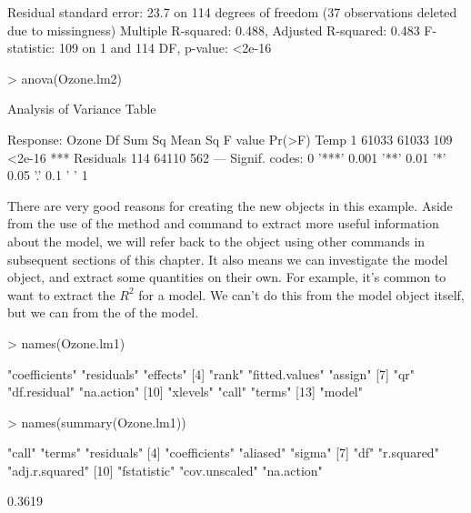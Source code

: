 \begin{Schunk}
\begin{Soutput}
Residual standard error: 23.7 on 114 degrees of freedom
  (37 observations deleted due to missingness)
Multiple R-squared:  0.488,	Adjusted R-squared:  0.483 
F-statistic:  109 on 1 and 114 DF,  p-value: <2e-16
\end{Soutput}
\begin{Sinput}
> anova(Ozone.lm2) 
\end{Sinput}
\begin{Soutput}
Analysis of Variance Table

Response: Ozone
           Df Sum Sq Mean Sq F value Pr(>F)    
Temp        1  61033   61033     109 <2e-16 ***
Residuals 114  64110     562                   
---
Signif. codes:  
0 '***' 0.001 '**' 0.01 '*' 0.05 '.' 0.1 ' ' 1
\end{Soutput}
\end{Schunk}

There are very good reasons for creating the new objects in this example. Aside from the use of the  method and  command to extract more useful information about the model, we will refer back to the object using other commands in subsequent sections of this chapter. It also means we can investigate the model object, and extract some quantities on their own. For example, it's common to want to extract the $R^2$ for a model. We can't do this from the model object itself, but we can from the  of the model. 

\begin{Schunk}
\begin{Sinput}
> names(Ozone.lm1) 
\end{Sinput}
\begin{Soutput}
 [1] "coefficients"  "residuals"     "effects"      
 [4] "rank"          "fitted.values" "assign"       
 [7] "qr"            "df.residual"   "na.action"    
[10] "xlevels"       "call"          "terms"        
[13] "model"        
\end{Soutput}
\begin{Sinput}
> names(summary(Ozone.lm1)) 
\end{Sinput}
\begin{Soutput}
 [1] "call"          "terms"         "residuals"    
 [4] "coefficients"  "aliased"       "sigma"        
 [7] "df"            "r.squared"     "adj.r.squared"
[10] "fstatistic"    "cov.unscaled"  "na.action"    
\end{Soutput}
\begin{Soutput}
[1] 0.3619
\end{Soutput}
\end{Schunk}

